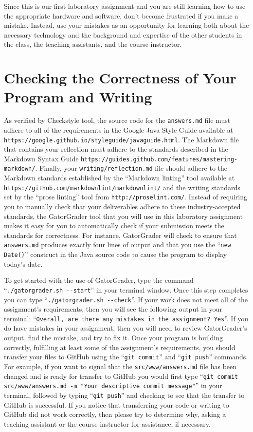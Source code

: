 \documentclass[11pt]{article}
\newcommand{\mainprogram}{\lstinline{answers.md}}
\newcommand{\mainprogramsource}{\lstinline{src/www/answers.md}}
\newcommand{\reflection}{\lstinline{writing/reflection.md}}
\newcommand{\gatorgraderstart}{\command{./gatorgrader.sh --start}}
\newcommand{\gatorgradercheck}{\command{./gatorgrader.sh --check}}
\newcommand{\gitcommit}{\command{git commit}}
\newcommand{\gitpush}{\command{git push}}
\newcommand{\gitcommitmainprogram}{\command{git commit src/www/answers.md -m "Your
descriptive commit message"}}
\newcommand{\command}[1]{``\lstinline{#1}''}
\newcommand{\url}[1]{\lstinline{#1}}
\newcommand{\step}[1]{``{#1}''}
\begin{document}
Since this is our first laboratory assignment and you are still learning how to use the appropriate hardware and
software, don't become frustrated if you make a mistake. Instead, use your mistakes as an opportunity for learning both
about the necessary technology and the background and expertise of the other students in the class, the teaching
assistants, and the course instructor.

\section*{Checking the Correctness of Your Program and Writing}

As verified by Checkstyle tool, the source code for the \mainprogram{} file must adhere to all of the requirements in
the Google Java Style Guide available at \url{https://google.github.io/styleguide/javaguide.html}. The Markdown file
that contains your reflection must adhere to the standards described in the Markdown Syntax Guide
\url{https://guides.github.com/features/mastering-markdown/}. Finally, your \reflection{} file should adhere to the
Markdown standards established by the \step{Markdown linting} tool available at
\url{https://github.com/markdownlint/markdownlint/} and the writing standards set by the \step{prose linting} tool from
\url{http://proselint.com/}. Instead of requiring you to manually check that your deliverables adhere to these
industry-accepted standards, the GatorGrader tool that you will use in this laboratory assignment makes it easy for you
to automatically check if your submission meets the standards for correctness. For instance, GatorGrader will check to
ensure that \mainprogram{} produces exactly four lines of output and that you use the \command{new Date()} construct in
the Java source code to cause the program to display today's date.

To get started with the use of GatorGrader, type the command \gatorgraderstart{} in your terminal window. Once this step
completes you can type \gatorgradercheck{}. If your work does not meet all of the assignment's requirements, then you
will see the following output in your terminal: \command{Overall, are there any mistakes in the assignment? Yes}. If you
do have mistakes in your assignment, then you will need to review GatorGrader's output, find the mistake, and try to fix
it. Once your program is building correctly, fulfilling at least some of the assignment's requirements, you should
transfer your files to GitHub using the \gitcommit{} and \gitpush{} commands. For example, if you want to signal that
the \mainprogramsource{} file has been changed and is ready for transfer to GitHub you would first type
\gitcommitmainprogram{} in your terminal, followed by typing \gitpush{} and checking to see that the transfer to GitHub
is successful. If you notice that transferring your code or writing to GitHub did not work correctly, then please try to
determine why, asking a teaching assistant or the course instructor for assistance, if necessary.
\end{document}
